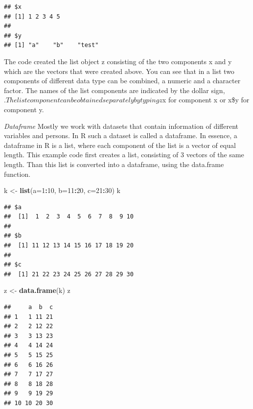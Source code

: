 \documentclass[]{book}
\newenvironment{Shaded}{\begin{snugshade}}{\end{snugshade}}
\newcommand{\KeywordTok}[1]{\textcolor[rgb]{0.13,0.29,0.53}{\textbf{#1}}}
\newcommand{\DataTypeTok}[1]{\textcolor[rgb]{0.13,0.29,0.53}{#1}}
\newcommand{\DecValTok}[1]{\textcolor[rgb]{0.00,0.00,0.81}{#1}}
\newcommand{\StringTok}[1]{\textcolor[rgb]{0.31,0.60,0.02}{#1}}
\newcommand{\OperatorTok}[1]{\textcolor[rgb]{0.81,0.36,0.00}{\textbf{#1}}}
\newcommand{\NormalTok}[1]{#1}
\theoremstyle{definition}
\theoremstyle{definition}
\theoremstyle{definition}
\theoremstyle{remark}
\begin{document}
\begin{verbatim}
## $x
## [1] 1 2 3 4 5
## 
## $y
## [1] "a"    "b"    "test"
\end{verbatim}

The code created the list object z consisting of the two components x
and y which are the vectors that were created above. You can see that in
a list two components of different data type can be combined, a numeric
and a character factor. The names of the list components are indicated
by the dollar sign,
\(. The list component can be obtained separately by typing z\)x for
component x or x\$y for component y.

\emph{Dataframe} Mostly we work with datasets that contain information
of different variables and persons. In R such a dataset is called a
dataframe. In essence, a dataframe in R is a list, where each component
of the list is a vector of equal length. This example code first creates
a list, consisting of 3 vectors of the same length. Than this list is
converted into a dataframe, using the data.frame function.

\begin{Shaded}
\begin{Highlighting}[]
\NormalTok{k <-}\StringTok{ }\KeywordTok{list}\NormalTok{(}\DataTypeTok{a=}\DecValTok{1}\OperatorTok{:}\DecValTok{10}\NormalTok{, }\DataTypeTok{b=}\DecValTok{11}\OperatorTok{:}\DecValTok{20}\NormalTok{, }\DataTypeTok{c=}\DecValTok{21}\OperatorTok{:}\DecValTok{30}\NormalTok{)}
\NormalTok{k}
\end{Highlighting}
\end{Shaded}

\begin{verbatim}
## $a
##  [1]  1  2  3  4  5  6  7  8  9 10
## 
## $b
##  [1] 11 12 13 14 15 16 17 18 19 20
## 
## $c
##  [1] 21 22 23 24 25 26 27 28 29 30
\end{verbatim}

\begin{Shaded}
\begin{Highlighting}[]
\NormalTok{z <-}\StringTok{ }\KeywordTok{data.frame}\NormalTok{(k)}
\NormalTok{z}
\end{Highlighting}
\end{Shaded}

\begin{verbatim}
##     a  b  c
## 1   1 11 21
## 2   2 12 22
## 3   3 13 23
## 4   4 14 24
## 5   5 15 25
## 6   6 16 26
## 7   7 17 27
## 8   8 18 28
## 9   9 19 29
## 10 10 20 30
\end{verbatim}
\end{document}
